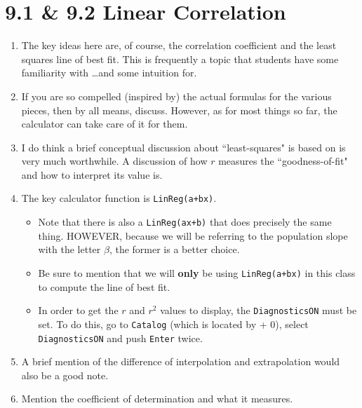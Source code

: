 \documentclass{article}
\begin{document}
\section*{9.1 \& 9.2 Linear Correlation}

\begin{enumerate}

  \item The key ideas here are, of course, the correlation coefficient and the least squares line of best fit. This is frequently a topic that students have some familiarity with \ldots and some intuition for.
  
  \item If you are so compelled (inspired by) the actual formulas for the various pieces, then by all means, discuss. However, as for most things so far, the calculator can take care of it for them.
  
  \item I do think a brief conceptual discussion about ``least-squares" is based on is very much worthwhile. A discussion of how $r$ measures the ``goodness-of-fit" and how to interpret its value is.
  
  \item The key calculator function is \texttt{LinReg(a+bx)}.
  
    \begin{itemize}
    
        \item Note that there is also a \texttt{LinReg(ax+b)} that does precisely the same thing. HOWEVER, because we will be referring to the population slope with the letter $\beta$, the former is a better choice.
        
        \item Be sure to mention that we will \textbf{only} be using \texttt{LinReg(a+bx)} in this class to compute the line of best fit.
        
        \item In order to get the $r$ and $r^2$ values to display, the \texttt{DiagnosticsON} must be set. To do this, go to \texttt{Catalog} (which is located by  + 0), select \texttt{DiagnosticsON} and push \texttt{Enter} twice.
        
    \end{itemize}
    
    \item A brief mention of the difference of interpolation and extrapolation would also be a good note.
    
    \item Mention the coefficient of determination and what it measures.
    
\end{enumerate}
\end{document}
